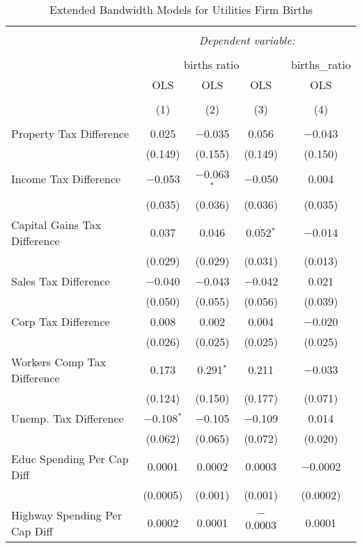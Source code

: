 
\begin{table}[!htbp] \centering 
  \caption{Extended Bandwidth Models for  Utilities Firm Births} 
  \label{22eb} 
\begin{tabular}{@{\extracolsep{5pt}}lcccc} 
\\[-1.8ex]\hline 
\hline \\[-1.8ex] 
 & \multicolumn{4}{c}{\textit{Dependent variable:}} \\ 
\cline{2-5} 
\\[-1.8ex] & \multicolumn{3}{c}{births ratio} & births\_ratio \\ 
 & OLS & OLS & OLS & OLS \\ 
\\[-1.8ex] & (1) & (2) & (3) & (4)\\ 
\hline \\[-1.8ex] 
 Property Tax Difference & 0.025 & $-$0.035 & 0.056 & $-$0.043 \\ 
  & (0.149) & (0.155) & (0.149) & (0.150) \\ 
  Income Tax Difference & $-$0.053 & $-$0.063$^{*}$ & $-$0.050 & 0.004 \\ 
  & (0.035) & (0.036) & (0.036) & (0.035) \\ 
  Capital Gains Tax Difference & 0.037 & 0.046 & 0.052$^{*}$ & $-$0.014 \\ 
  & (0.029) & (0.029) & (0.031) & (0.013) \\ 
  Sales Tax Difference & $-$0.040 & $-$0.043 & $-$0.042 & 0.021 \\ 
  & (0.050) & (0.055) & (0.056) & (0.039) \\ 
  Corp Tax Difference & 0.008 & 0.002 & 0.004 & $-$0.020 \\ 
  & (0.026) & (0.025) & (0.025) & (0.025) \\ 
  Workers Comp Tax Difference & 0.173 & 0.291$^{*}$ & 0.211 & $-$0.033 \\ 
  & (0.124) & (0.150) & (0.177) & (0.071) \\ 
  Unemp. Tax Difference & $-$0.108$^{*}$ & $-$0.105 & $-$0.109 & 0.014 \\ 
  & (0.062) & (0.065) & (0.072) & (0.020) \\ 
  Educ Spending Per Cap Diff & 0.0001 & 0.0002 & 0.0003 & $-$0.0002 \\ 
  & (0.0005) & (0.001) & (0.001) & (0.0002) \\ 
  Highway Spending Per Cap Diff & 0.0002 & 0.0001 & $-$0.0003 & 0.0001 \\ 

\end{tabular}
\end{table}
